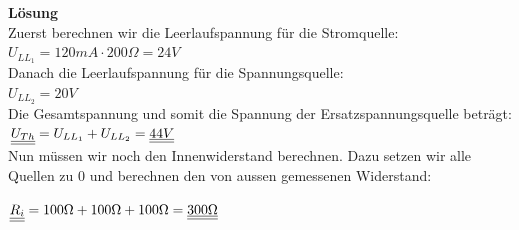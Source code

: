 										\begin{center}
											\fix
										\end{center}
										\iend
										\beginip
										\textbf{Lösung}
										\\
										Zuerst berechnen wir die Leerlaufspannung für die Stromquelle: \\
										$U_{LL_1} = 120mA \cdot 200 \Omega = 24V$ \\
										Danach die Leerlaufspannung für die Spannungsquelle: \\
										$ U_{LL_2} = 20V$\\
										Die Gesamtspannung und somit die Spannung der Ersatzspannungsquelle beträgt: \\
										$\underline{\underline{U_{Th}}} = U_{LL_1} + U_{LL_2} = \underline{\underline{44V}}$ \\

										Nun müssen wir noch den Innenwiderstand berechnen. Dazu setzen wir alle Quellen zu 0 und berechnen den von aussen gemessenen Widerstand:\\
										\begin{center}
											\fix
										\end{center}
															$\underline{\underline{R_i}} = 100\Omega + 100\Omega  + 100\Omega  = \underline{\underline{300 \Omega}} $
										\iend
